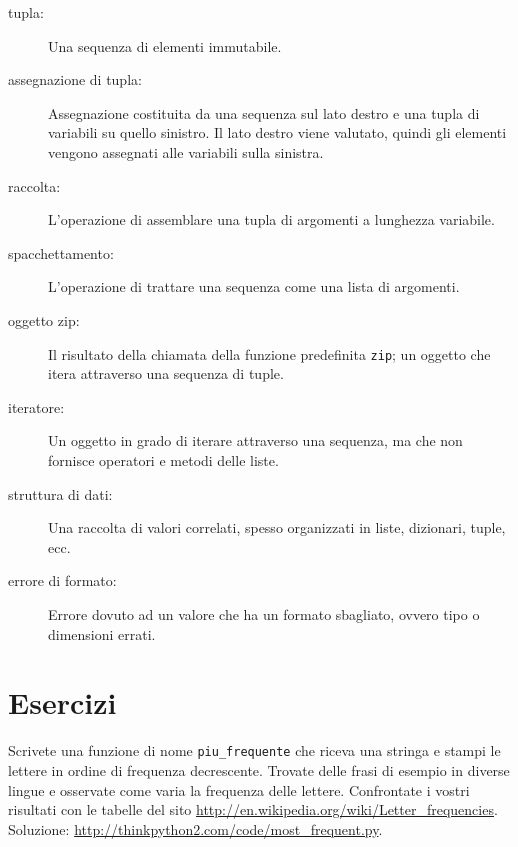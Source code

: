 \documentclass[10pt]{book}
\begin{document}
\begin{description}

\item[tupla:] Una sequenza di elementi immutabile.

\item[assegnazione di tupla:] Assegnazione costituita da una sequenza sul lato destro e una tupla di variabili su quello sinistro. Il lato destro viene valutato, quindi gli elementi vengono assegnati alle variabili sulla sinistra.

\item[raccolta:] L'operazione di assemblare una tupla di argomenti a lunghezza variabile.

\item[spacchettamento:] L'operazione di trattare una sequenza come una lista di argomenti.

\item[oggetto zip:] Il risultato della chiamata della funzione predefinita {\tt zip}; un oggetto che itera attraverso una sequenza di tuple.

\item[iteratore:] Un oggetto in grado di iterare attraverso una sequenza, ma che non fornisce operatori e metodi delle liste.

\item[struttura di dati:] Una raccolta di valori correlati, spesso organizzati in liste, dizionari, tuple, ecc.

\item[errore di formato:] Errore dovuto ad un valore che ha un formato sbagliato, ovvero tipo o dimensioni errati.

\end{description}


\section{Esercizi}

\begin{exercise}

Scrivete una funzione di nome \verb"piu_frequente" che riceva una stringa e stampi le lettere in ordine di frequenza decrescente. Trovate delle frasi di esempio in diverse lingue e osservate come varia la frequenza delle lettere. Confrontate i vostri risultati con le tabelle del sito
\url{http://en.wikipedia.org/wiki/Letter_frequencies}.  Soluzione:
\url{http://thinkpython2.com/code/most_frequent.py}.  

\end{exercise}
\end{document}
